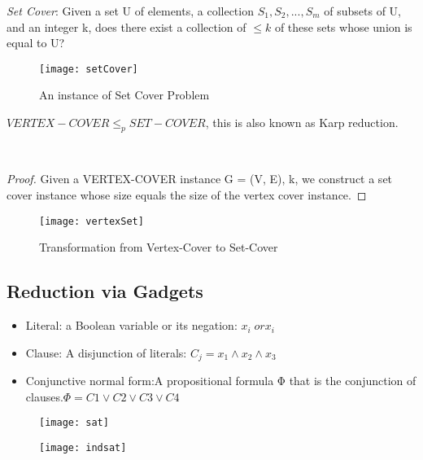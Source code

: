 \emph{Set Cover}:
Given a set U of elements, a collection $S_{1}, S_{2}, . . . , S_{m}$ of subsets of U, and an integer k, does there exist a collection of $\leq k$ of these sets whose union is equal to U?

\begin{figure}[H]
    \centering
    \texttt{[image: setCover]}
    \caption{An instance of Set Cover Problem}
\end{figure}

\begin{claim}
    $VERTEX-COVER \leq_{p} SET-COVER$, this is also known as Karp reduction.
\end{claim}\\

\begin{proof}
    Given a VERTEX-COVER instance G = (V, E), k, we construct a set cover instance whose size equals the size of the vertex cover instance.
\end{proof}

\begin{figure}[H]
    \centering
    \texttt{[image: vertexSet]}
    \caption{Transformation from Vertex-Cover to Set-Cover}
\end{figure}

\subsection{Reduction via Gadgets}

\begin{itemize}
    \item{Literal: a Boolean variable or its negation: $x_{i} \; or x_{i}$}
    \item{Clause: A disjunction of literals: $C_{j} =x_{1} \land x_{2}  \land x_{3}$}
    \item{Conjunctive normal form:A propositional formula Φ that is the conjunction of clauses.$ Φ= C1 \lor C2 \lor C3 \lor C4$}
\end{itemize}

\begin{figure}[H]
    \centering
    \texttt{[image: sat]}
\end{figure}

\begin{figure}[H]
    \centering
    \texttt{[image: indsat]}
\end{figure}

\clearpage
